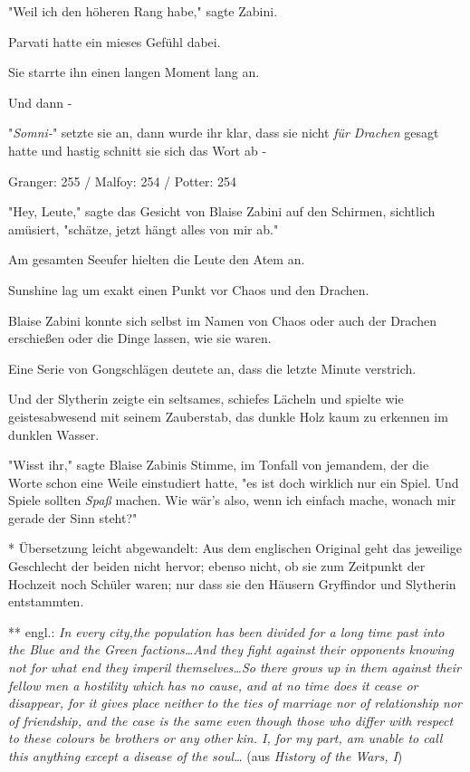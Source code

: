{"Weil ich den höheren Rang habe," sagte Zabini.

Parvati hatte ein mieses Gefühl dabei.

Sie starrte ihn einen langen Moment lang an.

Und dann -

"\emph{Somni-}" setzte sie an, dann wurde ihr klar, dass sie nicht \emph{für Drachen} gesagt hatte und hastig schnitt sie sich das Wort ab -

\later

Granger: 255 / Malfoy: 254 / Potter: 254

"Hey, Leute," sagte das Gesicht von Blaise Zabini auf den Schirmen, sichtlich amüsiert, "schätze, jetzt hängt alles von mir ab."

Am gesamten Seeufer hielten die Leute den Atem an.

Sunshine lag um exakt einen Punkt vor Chaos und den Drachen.

Blaise Zabini konnte sich selbst im Namen von Chaos oder auch der Drachen erschießen oder die Dinge lassen, wie sie waren.

Eine Serie von Gongschlägen deutete an, dass die letzte Minute verstrich.

Und der Slytherin zeigte ein seltsames, schiefes Lächeln und spielte wie geistesabwesend mit seinem Zauberstab, das dunkle Holz kaum zu erkennen im dunklen Wasser.

"Wisst ihr," sagte Blaise Zabinis Stimme, im Tonfall von jemandem, der die Worte schon eine Weile einstudiert hatte, "es ist doch wirklich nur ein Spiel. Und Spiele sollten \emph{Spaß} machen. Wie wär's also, wenn ich einfach mache, wonach mir gerade der Sinn steht?"

* Übersetzung leicht abgewandelt: Aus dem englischen Original geht das jeweilige Geschlecht der beiden nicht hervor; ebenso nicht, ob sie zum Zeitpunkt der Hochzeit noch Schüler waren; nur dass sie den Häusern Gryffindor und Slytherin entstammten.

** engl.: \emph{In every city,the population has been divided for a long time past into the Blue and the Green factions…And they fight against their opponents knowing not for what end they imperil themselves…So there grows up in them against their fellow men a hostility which has no cause, and at no time does it cease or disappear, for it gives place neither to the ties of marriage nor of relationship nor of friendship, and the case is the same even though those who differ with respect to these colours be brothers or any other kin. I, for my part, am unable to call this anything except a disease of the soul…} (aus \emph{History of the Wars, I})

}
